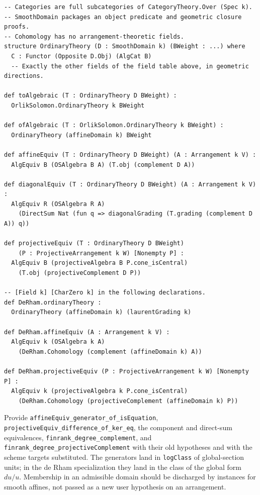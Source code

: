 \documentclass[11pt]{article}
\newcommand{\planned}[1]{\texttt{\detokenize{#1}}}
\theoremstyle{definition}
\theoremstyle{remark}
\renewcommand{\planned}[1]{\nolinkurl{#1}}
\begin{document}
\begin{lstlisting}
-- Categories are full subcategories of CategoryTheory.Over (Spec k).
-- SmoothDomain packages an object predicate and geometric closure proofs.
-- Cohomology has no arrangement-theoretic fields.
structure OrdinaryTheory (D : SmoothDomain k) (BWeight : ...) where
  C : Functor (Opposite D.Obj) (AlgCat B)
  -- Exactly the other fields of the field table above, in geometric directions.

def toAlgebraic (T : OrdinaryTheory D BWeight) :
  OrlikSolomon.OrdinaryTheory k BWeight

def ofAlgebraic (T : OrlikSolomon.OrdinaryTheory k BWeight) :
  OrdinaryTheory (affineDomain k) BWeight

def affineEquiv (T : OrdinaryTheory D BWeight) (A : Arrangement k V) :
  AlgEquiv B (OSAlgebra B A) (T.obj (complement D A))

def diagonalEquiv (T : OrdinaryTheory D BWeight) (A : Arrangement k V) :
  AlgEquiv R (OSAlgebra R A)
    (DirectSum Nat (fun q => diagonalGrading (T.grading (complement D A)) q))

def projectiveEquiv (T : OrdinaryTheory D BWeight)
    (P : ProjectiveArrangement k W) [Nonempty P] :
  AlgEquiv B (projectiveAlgebra B P.cone_isCentral)
    (T.obj (projectiveComplement D P))

-- [Field k] [CharZero k] in the following declarations.
def DeRham.ordinaryTheory :
  OrdinaryTheory (affineDomain k) (laurentGrading k)

def DeRham.affineEquiv (A : Arrangement k V) :
  AlgEquiv k (OSAlgebra k A)
    (DeRham.Cohomology (complement (affineDomain k) A))

def DeRham.projectiveEquiv (P : ProjectiveArrangement k W) [Nonempty P] :
  AlgEquiv k (projectiveAlgebra k P.cone_isCentral)
    (DeRham.Cohomology (projectiveComplement (affineDomain k) P))
\end{lstlisting}

Provide \planned{affineEquiv_generator_of_isEquation}, \planned{projectiveEquiv_difference_of_ker_eq}, the component and direct-sum equivalences, \planned{finrank_degree_complement}, and \planned{finrank_degree_projectiveComplement} with their old hypotheses and with the scheme targets substituted. The generators land in \planned{logClass} of global-section units; in the de Rham specialization they land in the class of the global form $du/u$. Membership in an admissible domain should be discharged by instances for smooth affines, not passed as a new user hypothesis on an arrangement.
\end{document}
